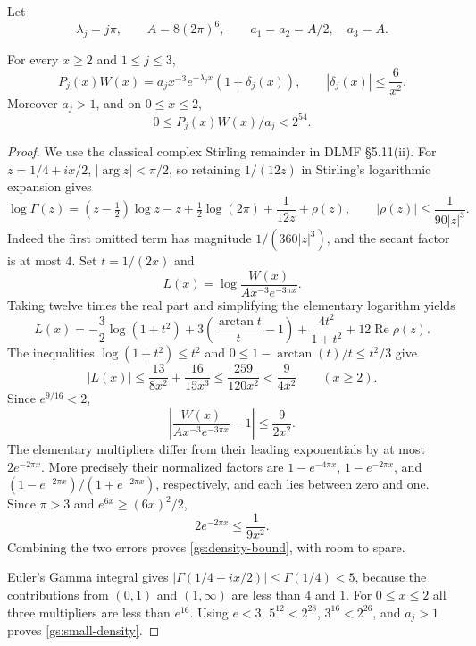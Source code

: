Let
\begin{equation}\label{gs:scales}
 \lambda_j=j\pi,\qquad A=8(2\pi)^6,
 \qquad a_1=a_2=A/2,\quad a_3=A.
\end{equation}

\begin{lemma}\label{gs:density}
For every $x\ge2$ and $1\le j\le3$,
\begin{equation}\label{gs:density-bound}
 P_j(x)W(x)=a_jx^{-3}e^{-\lambda_jx}(1+\delta_j(x)),
 \qquad |\delta_j(x)|\le\frac6{x^2}.
\end{equation}
Moreover $a_j>1$, and on $0\le x\le2$,
\begin{equation}\label{gs:small-density}
                  0\le P_j(x)W(x)/a_j<2^{54}.
\end{equation}
\end{lemma}

\begin{proof}
We use the classical complex Stirling remainder in DLMF
\S5.11(ii).  For $z=1/4+ix/2$, $|\arg z|<\pi/2$, so retaining
$1/(12z)$ in Stirling's logarithmic expansion gives
\[
 \log\Gamma(z)=(z-\tfrac12)\log z-z+\tfrac12\log(2\pi)
                         +\frac1{12z}+\rho(z),
 \qquad |\rho(z)|\le\frac1{90|z|^3}.
\]
Indeed the first omitted term has magnitude $1/(360|z|^3)$,
and the secant factor is at most $4$.
Set $t=1/(2x)$ and
\[
 L(x)=\log\frac{W(x)}{Ax^{-3}e^{-3\pi x}}.
\]
Taking twelve times the real part and simplifying the elementary
logarithm yields
\[
 L(x)=-\frac32\log(1+t^2)
       +3\left(\frac{\arctan t}{t}-1\right)
       +\frac{4t^2}{1+t^2}+12\operatorname{Re}\rho(z).
\]
The inequalities $\log(1+t^2)\le t^2$ and
$0\le1-\arctan(t)/t\le t^2/3$ give
\[
 |L(x)|\le\frac{13}{8x^2}+\frac{16}{15x^3}
        \le\frac{259}{120x^2}<\frac9{4x^2}\qquad(x\ge2).
\]
Since $e^{9/16}<2$,
\[
 \left|\frac{W(x)}{Ax^{-3}e^{-3\pi x}}-1\right|
        \le\frac9{2x^2}.
\]
The elementary multipliers differ from their leading exponentials by
at most $2e^{-2\pi x}$.  More precisely their normalized factors are
$1-e^{-4\pi x}$, $1-e^{-2\pi x}$, and
$(1-e^{-2\pi x})/(1+e^{-2\pi x})$, respectively, and each lies
between zero and one.  Since $\pi>3$ and
$e^{6x}\ge(6x)^2/2$,
\[
                    2e^{-2\pi x}\le\frac1{9x^2}.
\]
Combining the two errors proves \eqref{gs:density-bound}, with
room to spare.

Euler's Gamma integral gives
$|\Gamma(1/4+ix/2)|\le\Gamma(1/4)<5$, because the contributions
from $(0,1)$ and $(1,\infty)$ are less than $4$ and $1$.
For $0\le x\le2$ all three multipliers are less than $e^{16}$.
Using $e<3$, $5^{12}<2^{28}$, $3^{16}<2^{26}$, and $a_j>1$
proves \eqref{gs:small-density}.
\end{proof}

